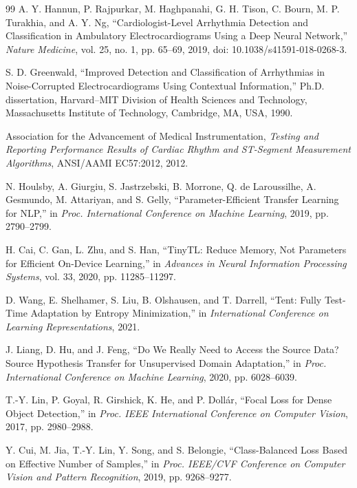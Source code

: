 \begin{thebibliography}{99}
A. Y. Hannun, P. Rajpurkar, M. Haghpanahi, G. H. Tison, C. Bourn,
M. P. Turakhia, and A. Y. Ng,
``Cardiologist-Level Arrhythmia Detection and Classification in Ambulatory
Electrocardiograms Using a Deep Neural Network,''
\emph{Nature Medicine}, vol. 25, no. 1, pp. 65--69, 2019,
doi: 10.1038/s41591-018-0268-3.

S. D. Greenwald,
``Improved Detection and Classification of Arrhythmias in Noise-Corrupted
Electrocardiograms Using Contextual Information,''
Ph.D. dissertation, Harvard--MIT Division of Health Sciences and Technology,
Massachusetts Institute of Technology, Cambridge, MA, USA, 1990.

Association for the Advancement of Medical Instrumentation,
\emph{Testing and Reporting Performance Results of Cardiac Rhythm and
ST-Segment Measurement Algorithms}, ANSI/AAMI EC57:2012, 2012.

N. Houlsby, A. Giurgiu, S. Jastrzebski, B. Morrone, Q. de Laroussilhe,
A. Gesmundo, M. Attariyan, and S. Gelly,
``Parameter-Efficient Transfer Learning for NLP,''
in \emph{Proc. International Conference on Machine Learning},
2019, pp. 2790--2799.

H. Cai, C. Gan, L. Zhu, and S. Han,
``TinyTL: Reduce Memory, Not Parameters for Efficient On-Device Learning,''
in \emph{Advances in Neural Information Processing Systems},
vol. 33, 2020, pp. 11285--11297.

D. Wang, E. Shelhamer, S. Liu, B. Olshausen, and T. Darrell,
``Tent: Fully Test-Time Adaptation by Entropy Minimization,''
in \emph{International Conference on Learning Representations}, 2021.

J. Liang, D. Hu, and J. Feng,
``Do We Really Need to Access the Source Data? Source Hypothesis Transfer for
Unsupervised Domain Adaptation,''
in \emph{Proc. International Conference on Machine Learning},
2020, pp. 6028--6039.

T.-Y. Lin, P. Goyal, R. Girshick, K. He, and P. Doll\'ar,
``Focal Loss for Dense Object Detection,''
in \emph{Proc. IEEE International Conference on Computer Vision},
2017, pp. 2980--2988.

Y. Cui, M. Jia, T.-Y. Lin, Y. Song, and S. Belongie,
``Class-Balanced Loss Based on Effective Number of Samples,''
in \emph{Proc. IEEE/CVF Conference on Computer Vision and Pattern
Recognition}, 2019, pp. 9268--9277.


\end{thebibliography}
